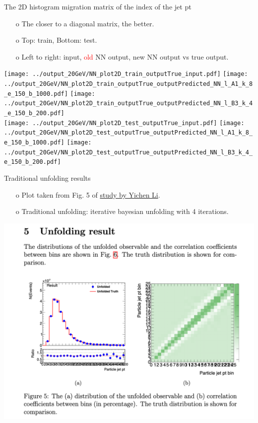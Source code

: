 \begin{frame}{The 2D histogram migration matrix of the index of the jet pt}
\begin{enumerate}
\item[o] The closer to a diagonal matrix, the better.
\item[o] Top: train, Bottom: test.
\item[o] Left to right: input, \textcolor{red}{old} NN output, \textcolor{OliveGreen}{new} NN output vs true output. 
\end{enumerate}
\centering
\texttt{[image: ../output\_20GeV/NN\_plot2D\_train\_outputTrue\_input.pdf]}
\texttt{[image: ../output\_20GeV/NN\_plot2D\_train\_outputTrue\_outputPredicted\_NN\_l\_A1\_k\_8\_e\_150\_b\_1000.pdf]}
\texttt{[image: ../output\_20GeV/NN\_plot2D\_train\_outputTrue\_outputPredicted\_NN\_l\_B3\_k\_4\_e\_150\_b\_200.pdf]}\\
\texttt{[image: ../output\_20GeV/NN\_plot2D\_test\_outputTrue\_input.pdf]}
\texttt{[image: ../output\_20GeV/NN\_plot2D\_test\_outputTrue\_outputPredicted\_NN\_l\_A1\_k\_8\_e\_150\_b\_1000.pdf]}
\texttt{[image: ../output\_20GeV/NN\_plot2D\_test\_outputTrue\_outputPredicted\_NN\_l\_B3\_k\_4\_e\_150\_b\_200.pdf]}\\
\end{frame}
\clearpage

\begin{frame}{Traditional unfolding results}
\begin{enumerate}
\item[o] Plot taken from Fig. 5 of \href{http://www.desy.de/~liyichen/Unfolding.pdf}{study by Yichen Li}.
\item[o] Traditional unfolding: iterative bayesian unfolding with 4 iterations.
\end{enumerate}
\centering
\includegraphics[height=0.65\textheight]{./plots/TraditionalUnfolding.png}
\end{frame}
\clearpage

